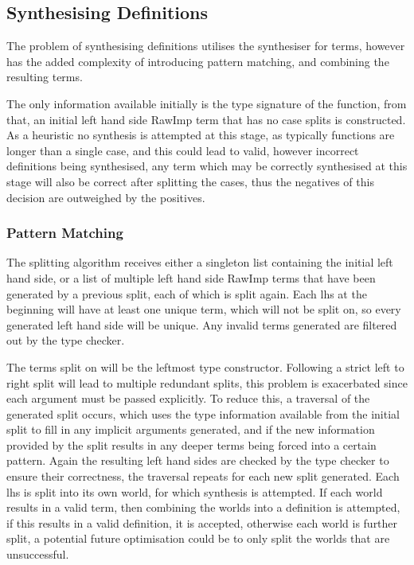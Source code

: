 \documentclass[a4paper]{article}
\begin{document}
\subsection{Synthesising Definitions}
\label{sec:org7318356}

The problem of synthesising definitions utilises the synthesiser for
terms, however has the added complexity of introducing pattern matching, 
and combining the resulting terms. 

The only information available initially is the type 
signature of the function, from that, an initial left hand side RawImp
term that has no case splits is constructed. As a heuristic no synthesis 
is attempted at this stage, as typically functions are longer than a single 
case, and this could lead to valid, however incorrect definitions being
synthesised, any term which may be correctly synthesised at this stage will 
also be correct after splitting the cases, thus the negatives of this decision
are outweighed by the positives.

\subsubsection{Pattern Matching}
\label{sec:org38930cc}
The splitting algorithm receives either a singleton list containing the initial
left hand side, or a list of multiple left hand side RawImp terms that have been generated by a previous split, 
each of which is split again. Each lhs at the beginning will have
at least one unique term, which will not be split on, so every generated
left hand side will be unique. Any invalid terms generated are filtered out by 
the type checker. 

The terms split on will be the leftmost type constructor. Following a strict 
left to right split will lead to multiple redundant splits, this problem is 
exacerbated since each argument must be passed explicitly. To reduce this, 
a traversal of the generated split occurs, which uses the type information 
available from the initial split to fill in any implicit arguments generated, 
and if the new information provided by the split results in any deeper terms 
being forced into a certain pattern. Again the resulting left hand sides are
checked by the type checker to ensure their correctness, the traversal repeats for
each new split generated. Each lhs is split
into its own world, for which synthesis is attempted. If each world results 
in a valid term, then combining the worlds into a definition is attempted, if this
results in a valid definition, it is accepted, otherwise each world is further
split, a potential future optimisation could be to only split the worlds that are 
unsuccessful.
\end{document}
